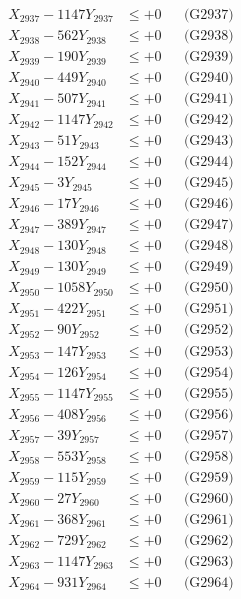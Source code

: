 \documentclass[a4paper,10pt]{article}
\begin{document}
{\begin{align}
X_{2937} - 1147Y_{2937} &\leq +0 && \text{(G2937)} \\
X_{2938} - 562Y_{2938} &\leq +0 && \text{(G2938)} \\
X_{2939} - 190Y_{2939} &\leq +0 && \text{(G2939)} \\
X_{2940} - 449Y_{2940} &\leq +0 && \text{(G2940)} \\
\allowbreak
X_{2941} - 507Y_{2941} &\leq +0 && \text{(G2941)} \\
X_{2942} - 1147Y_{2942} &\leq +0 && \text{(G2942)} \\
X_{2943} - 51Y_{2943} &\leq +0 && \text{(G2943)} \\
X_{2944} - 152Y_{2944} &\leq +0 && \text{(G2944)} \\
X_{2945} - 3Y_{2945} &\leq +0 && \text{(G2945)} \\
X_{2946} - 17Y_{2946} &\leq +0 && \text{(G2946)} \\
X_{2947} - 389Y_{2947} &\leq +0 && \text{(G2947)} \\
X_{2948} - 130Y_{2948} &\leq +0 && \text{(G2948)} \\
X_{2949} - 130Y_{2949} &\leq +0 && \text{(G2949)} \\
X_{2950} - 1058Y_{2950} &\leq +0 && \text{(G2950)} \\
\allowbreak
X_{2951} - 422Y_{2951} &\leq +0 && \text{(G2951)} \\
X_{2952} - 90Y_{2952} &\leq +0 && \text{(G2952)} \\
X_{2953} - 147Y_{2953} &\leq +0 && \text{(G2953)} \\
X_{2954} - 126Y_{2954} &\leq +0 && \text{(G2954)} \\
X_{2955} - 1147Y_{2955} &\leq +0 && \text{(G2955)} \\
X_{2956} - 408Y_{2956} &\leq +0 && \text{(G2956)} \\
X_{2957} - 39Y_{2957} &\leq +0 && \text{(G2957)} \\
X_{2958} - 553Y_{2958} &\leq +0 && \text{(G2958)} \\
X_{2959} - 115Y_{2959} &\leq +0 && \text{(G2959)} \\
X_{2960} - 27Y_{2960} &\leq +0 && \text{(G2960)} \\
\allowbreak
X_{2961} - 368Y_{2961} &\leq +0 && \text{(G2961)} \\
X_{2962} - 729Y_{2962} &\leq +0 && \text{(G2962)} \\
X_{2963} - 1147Y_{2963} &\leq +0 && \text{(G2963)} \\
X_{2964} - 931Y_{2964} &\leq +0 && \text{(G2964)} \\

\end{align}}
\end{document}
